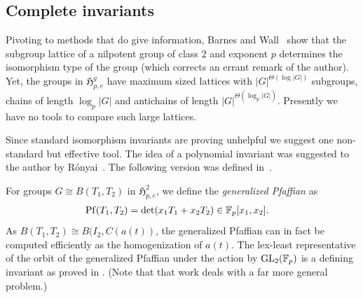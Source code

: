 \documentclass{toc}
\numberwithin{equation}{section}
\theoremstyle{plain}       %
\theoremstyle{remark}
\theoremstyle{definition}
\numberwithin{figure}{section}
\numberwithin{table}{section}
\newcommand{\mygroups}{\mathfrak{H}}
\newcommand{\bbF}{\mathbb{F}}  %
\begin{document}
\subsection{Complete invariants}
Pivoting to methods that do give information, 
Barnes and Wall~\cite{Barnes-Wall}
show that the subgroup lattice of a nilpotent group of class $2$ and exponent
$p$ determines the isomorphism type of the group (which corrects an errant
remark of the author).  Yet, the groups in $\mygroups_{p,e}^g$ have maximum
sized lattices with $|G|^{\Theta(\log |G|)}$ subgroups,
chains of length $\log_p |G|$ and antichains of length
$|G|^{\Theta(\log_p |G|)}$.  Presently we have no
tools to compare such large lattices.

Since standard isomorphism invariants are proving unhelpful we suggest one
non-standard but effective tool.  The idea of a polynomial invariant was
suggested to the author by R\'onyai~\cite{Ronyai:private}.  The following
version was defined in~\cite{BMW}.

For groups $G\cong B(T_1,T_2)$ in $\mygroups_{p,e}^2$, we define the
\emph{generalized Pfaffian} as 
\begin{align}\label{def:Pfaffian}
	{\rm Pf}(T_1,T_2) & = \det (x_1 T_1+x_2 T_2)
	\in \bbF_p[x_1,x_2].
\end{align}
As $B(T_1,T_2)\cong B(I_2,C(a(t))$, the generalized Pfaffian can in fact be
computed efficiently as the homogenization of $a(t)$.  The lex-least
representative of the orbit of the generalized Pfaffian under the action by
${\rm GL}_2(\bbF_{p})$ is a defining invariant as proved in \cite{BMW}.  
(Note that
that   %
work deals with a far more general problem.)
\end{document}

